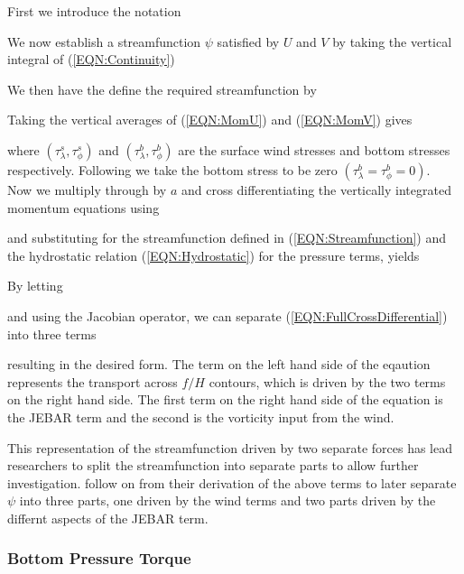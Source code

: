 \documentclass[..\EOYR.tex]{subfiles}
\begin{document}
First we introduce the notation

We now establish a streamfunction $\psi$ satisfied by $U$ and $V$ by taking the vertical integral of (\ref{EQN:Continuity})

We then have the define the required streamfunction by

%
Taking the vertical averages of (\ref{EQN:MomU}) and (\ref{EQN:MomV}) gives


where $\left(\tau_\lambda^s, \tau_\phi^s\right)$ and $\left(\tau_\lambda^b, \tau_\phi^b\right)$ are the surface wind stresses and bottom stresses respectively. Following \citep{Greatbatch1991} we take the bottom stress to be zero $\left(\tau_\lambda^b=\tau_\phi^b=0\right)$.\\

Now we multiply through by $a$ and cross differentiating the vertically integrated momentum equations using

and substituting for the streamfunction defined in (\ref{EQN:Streamfunction}) and the hydrostatic relation (\ref{EQN:Hydrostatic}) for the pressure terms, yields


By letting

and using the Jacobian operator, we can separate (\ref{EQN:FullCrossDifferential}) into three terms

resulting in the desired form. The term on the left hand side of the eqaution represents the transport across $f/H$ contours, which is driven by the two terms on the right hand side. The first term on the right hand side of the equation is the JEBAR term and the second is the vorticity input from the wind.

This representation of the streamfunction driven by two separate forces has lead researchers to split the streamfunction into separate parts to allow further investigation. \citep{Greatbatch1991} follow on from their derivation of the above terms to later separate $\psi$ into three parts, one driven by the wind terms and two parts driven by the differnt aspects of the JEBAR term. 








\subsubsection{Bottom Pressure Torque}
\label{SSSEC:BPT}
\end{document}
